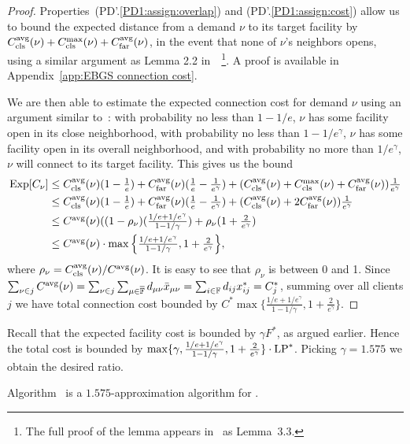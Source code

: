 \begin{proof}
  Properties~(PD'.\ref{PD1:assign:overlap}) and
  (PD'.\ref{PD1:assign:cost}) allow us to bound the expected distance
  from a demand $\nu$ to its target facility by
  $C_{\text{cls}}^{{\mbox{\scriptsize\rm avg}}}(\nu)+C_{\text{cls}}^{\max}(\nu)+C_{\text{far}}^{{\mbox{\scriptsize\rm avg}}}(\nu)$, in the event that none
  of $\nu$'s neighbors opens, using a similar argument as Lemma 2.2
  in~\cite{ByrkaGS10}~\footnote{The full proof of the lemma appears
    in~\cite{ByrkaA10} as Lemma~3.3.}. A proof is available in
  Appendix~\ref{app:EBGS connection cost}.

  We are then able to estimate the expected connection cost for demand
  $\nu$ using an argument similar to~\cite{ByrkaGS10}: with
  probability no less than $1-1/e$, $\nu$ has some facility open in
  its close neighborhood, with probability no less than
  $1-1/e^\gamma$, $\nu$ has some facility open in its overall
  neighborhood, and with probability no more than $1/e^\gamma$, $\nu$
  will connect to its target facility.  This gives us the bound
%
\begin{align*}
  \mbox{\rm Exp}[C_{\nu}] &\leq 
	\textstyle 
	C_{\text{cls}}^{{\mbox{\scriptsize\rm avg}}}(\nu)(1-\frac{1}{e}) + C_{\text{far}}^{{\mbox{\scriptsize\rm avg}}}(\nu)(\frac{1}{e}-\frac{1}{e^\gamma}) 
					+ (C_{\text{cls}}^{{\mbox{\scriptsize\rm avg}}}(\nu)+C_{\text{cls}}^{\max}(\nu)+C_{\text{far}}^{{\mbox{\scriptsize\rm avg}}}(\nu))\frac{1}{e^\gamma}
\\
  &\leq 
	\textstyle
	C_{\text{cls}}^{{\mbox{\scriptsize\rm avg}}}(\nu)(1-\frac{1}{e}) + C_{\text{far}}^{{\mbox{\scriptsize\rm avg}}}(\nu)(\frac{1}{e}-\frac{1}{e^\gamma})
	 			+ (C_{\text{cls}}^{{\mbox{\scriptsize\rm avg}}}(\nu)+2C_{\text{far}}^{{\mbox{\scriptsize\rm avg}}}(\nu))\frac{1}{e^\gamma}
\\
  &\leq
	\textstyle
  C^{{\mbox{\scriptsize\rm avg}}}(\nu)((1-\rho_{\nu})(\frac{1/e+1/e^\gamma}{1-1/\gamma})
  + \rho_{\nu}(1+\frac{2}{e^\gamma}) 
\\
  &\leq 
	\textstyle
	C^{{\mbox{\scriptsize\rm avg}}}(\nu) \cdot \max\Big\{\frac{1/e+1/e^\gamma}{1-1/\gamma},
  								1+\frac{2}{e^\gamma}\Big\},
\end{align*}
%
where $\rho_{\nu}=C_{\text{cls}}^{{\mbox{\scriptsize\rm avg}}}(\nu)/C^{{\mbox{\scriptsize\rm avg}}}(\nu)$. It is easy
to see that $\rho_{\nu}$ is between 0 and 1.
Since $\sum_{\nu\in j} C^{{\mbox{\scriptsize\rm avg}}}(\nu) = \sum_{\nu\in
  j}\sum_{\mu\in\overline{\mathbb{F}}} d_{\mu\nu}{\bar x}_{\mu\nu} =
\sum_{i\in\mathbb{F}} d_{ij}x_{ij}^\ast = C_j^\ast$, summing
over all clients $j$ we have total connection cost bounded
by $C^\ast \max\{\frac{1/e+1/e^\gamma}{1-1/\gamma},
1+\frac{2}{e^\gamma}\}$. 
\end{proof}

Recall that the expected facility cost is bounded by $\gamma F^\ast$,
as argued earlier. Hence the total cost is bounded by $\max\{\gamma,
\frac{1/e+1/e^\gamma}{1-1/\gamma}, 1+\frac{2}{e^\gamma}\}\cdot
\mbox{\rm LP}^\ast$. Picking $\gamma=1.575$ we obtain the desired ratio.


\begin{theorem}\label{thm:ebgs}
  Algorithm~{\EBGS} is a $1.575$-approximation algorithm for \FTFP.
\end{theorem}



